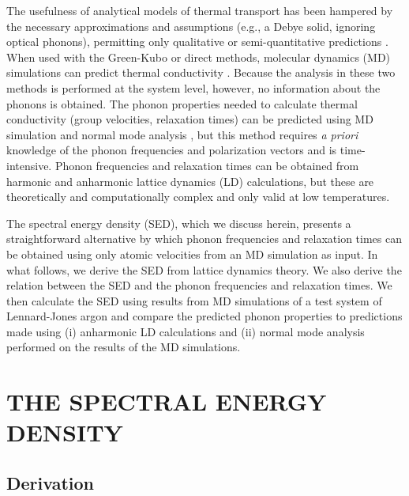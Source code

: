 \documentclass[twocolumn,10pt]{asme2e}
\begin{document}
The usefulness of analytical models of thermal transport has been hampered by
the necessary approximations and assumptions (e.g., a Debye solid, ignoring
optical phonons), permitting only qualitative or semi-quantitative
predictions \cite{callaway1959,holland1963}. When used with the Green-Kubo or
direct methods, molecular dynamics (MD) simulations can predict thermal
conductivity \cite{mcgaughey2004c,landry2008,schelling2002,sellan2010a}.
Because the analysis in these two methods is performed at the system level,
however, no information about the phonons is obtained. The phonon properties
needed to calculate thermal conductivity (group velocities, relaxation times)
can be predicted using MD simulation and normal mode analysis
\cite{ladd1986,mcgaughey2004c,henry2008,goicochea2010}, but this method
requires {\em a priori} knowledge of the phonon frequencies and polarization
vectors and is time-intensive. Phonon frequencies and relaxation times can be
obtained from harmonic and anharmonic lattice dynamics (LD)
calculations,\cite{maradudin1962,wallace1972,ladd1986,dove1993,turney2009a}
but these are theoretically and computationally complex and only valid at low
temperatures.

The spectral energy density
(SED)\cite{marayuma2003,shiomi2006,dekoker2009,thomas2010c}, which we discuss
herein, presents a straightforward alternative by which phonon frequencies
and relaxation times can be obtained using only atomic velocities from an MD
simulation as input. In what follows, we derive the SED from lattice dynamics
theory. We also derive the relation between the SED and the phonon
frequencies and relaxation times. We then calculate the SED using results
from MD simulations of a test system of Lennard-Jones argon and compare the
predicted phonon properties to predictions made using (i) anharmonic LD
calculations and (ii) normal mode analysis performed on the results of the MD
simulations.

\section*{THE SPECTRAL ENERGY DENSITY}\label{S:SED}

\subsection*{Derivation}\label{SS:derivation}
\end{document}
